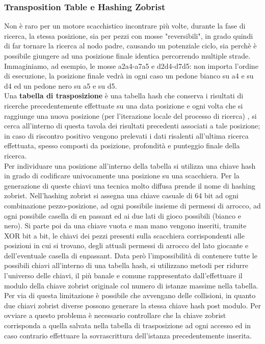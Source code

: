 \subsubsection{Transposition Table e Hashing Zobrist}
Non è raro per un motore scacchistico incontrare più volte, durante la fase di ricerca, la stessa posizione, sia per pezzi con mosse "reversibili", in grado quindi di far tornare la ricerca al nodo padre,
causando un potenziale ciclo, sia perchè è possibile giungere ad una posizione finale identica percorrendo multiple strade. Immaginiamo, ad esempio, le mosse a2a4-a7a5 e d2d4-d7d5: non importa l'ordine di esecuzione,
la posizione finale vedrà in ogni caso un pedone bianco su a4 e su d4 ed un pedone nero su a5 e su d5.
\\ Una \textbf{tabella di trasposizione} è una tabella hash che conserva i risultati di ricerche precedentemente effettuate
su una data posizione e ogni volta che si raggiunge una nuova posizione (per l'iterazione locale del processo di ricerca) , si cerca all'interno di questa tavola dei risultati precedenti associati a tale posizione; in caso di riscontro positivo
vengono prelevati i dati risalenti all'ultima ricerca effettuata, spesso composti da posizione, profondità e punteggio finale della ricerca.
\\Per individuare una posizione all'interno della tabella si utilizza una chiave hash in grado di codificare univocamente una posizione su una scacchiera. Per la generazione di queste chiavi una tecnica molto diffusa prende il nome di hashing zobrist. 
Nell'hashing zobrist si assegna una chiave casuale di 64 bit ad ogni combinazione pezzo-posizione, ad ogni possibile insieme di permessi di arrocco, ad ogni possibile casella di en passant ed ai due lati di gioco possibili (bianco e nero).
Si parte poi da una chiave vuota e man mano vengono inseriti, tramite XOR bit a bit, le chiavi dei pezzi presenti sulla scacchiera corrispondenti alle posizioni in cui si trovano, degli attuali permessi di arrocco
del lato giocante e dell'eventuale casella di enpassant. Data però l'impossibilità di contenere tutte le possibili chiavi all'interno di una tabella hash, si utilizzano metodi per ridurre l'universo delle chiavi,
il più banale e comune rappresentato dall'effettuare il modulo della chiave zobrist originale col numero di istanze massime nella tabella. Per via di questa limitazione è possibile che avvengano delle collisioni,
in quanto due chiavi zobrist diverse possono generare la stessa chiave hash post modulo. Per ovviare a questo problema è necessario controllare che la chiave zobrist corrisponda a quella salvata nella tabella di 
trasposizione ad ogni accesso ed in caso contrario effettuare la sovrascrittura dell'istanza precedentemente inserita.



